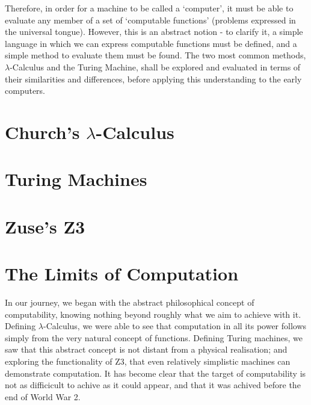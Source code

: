 \documentclass {article}
\begin{document}
Therefore, in order for a machine to be called a `computer', it must be able to evaluate any member of a set of `computable functions' (problems expressed in the universal tongue). However, this is an abstract notion - to clarify it, a simple language in which we can express computable functions must be defined, and a simple method to evaluate them must be found. The two most common methods, $\lambda$-Calculus and the Turing Machine, shall be explored and evaluated in terms of their similarities and differences, before applying this understanding to the early computers.



\section{Church's $\lambda$-Calculus}



\section{Turing Machines}



\section{Zuse's Z3}



\section*{The Limits of Computation}

In our journey, we began with the abstract philosophical concept of computability, knowing nothing beyond roughly what we aim to achieve with it. Defining $\lambda$-Calculus, we were able to see that computation in all its power follows simply from the very natural concept of functions. Defining Turing machines, we saw that this abstract concept is not distant from a physical realisation; and exploring the functionality of Z3, that even relatively simplistic machines can demonstrate computation. It has become clear that the target of computability is not as difficicult to achive as it could appear, and that it was achived before the end of World War 2.
\end{document}
